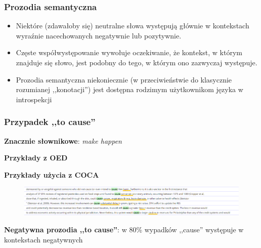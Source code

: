 \documentclass[11pt]{beamer}
\begin{document}
\begin{frame}
  \frametitle{Prozodia semantyczna}
  \begin{itemize}
	\item Niektóre (zdawałoby się) neutralne słowa występują głównie w kontekstach wyraźnie nacechowanych negatywnie lub pozytywnie.
	\item Częste współwystępowanie wywołuje oczekiwanie, że kontekst, w którym znajduje się słowo, jest podobny do tego, w którym ono zazwyczaj występuje.
  \item Prozodia semantyczna niekoniecznie (w przeciwieństwie do klasycznie rozumianej ,,konotacji'') jest dostępna rodzimym użytkownikom języka w introspekcji
\end{itemize}
\end{frame}

\begin{frame}
  \frametitle{Przypadek ,,to cause''}
\textbf{Znacznie słownikowe}: \textit{make happen}

\vspace{1em}
\textbf{Przykłady z OED}

\vspace{1em}
\textbf{Przykłady użycia z COCA}
\begin{figure}
	\includegraphics[scale=0.5]{uzycia_cause_coca}
\end{figure}
\vspace{1em}
\textbf{Negatywna prozodia ,,to cause''}: w 80\% wypadków ,,cause'' występuje w kontekstach negatywnych
\vspace{2em}
\end{frame}
\end{document}
